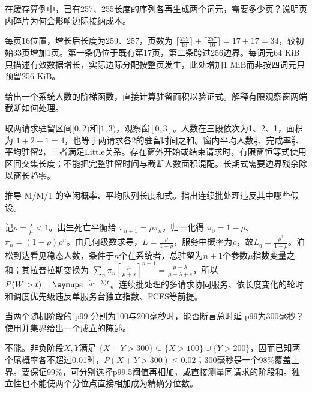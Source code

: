 \begin{exercises}
\begin{exercise} 在缓存算例中，已有257、255长度的序列各再生成两个词元，需要多少页？说明页内碎片为何会影响边际接纳成本。

\begin{solution}
每页16位置，增长后长度为259、257，页数为 $\lceil\frac{259}{16}\rceil+\lceil\frac{257}{16}\rceil=17+17=34$，较初始33页增加1页。第一条仍位于既有第17页，第二条跨过256边界。每词元64 KiB只描述有效数据增长，实际边际分配按整页发生，此处增加1 MiB而非按四词元只预留256 KiB。
\end{solution}
\end{exercise}

\begin{exercise} 给出一个系统人数的阶梯函数，直接计算驻留面积以验证式。解释有限观察窗两端截断如何处理。

\begin{solution}
取两请求驻留区间$[0,2)$和$[1,3)$，观察窗$[0,3]$。人数在三段依次为1、2、1，面积为 $1+2+1=4$，也等于两请求各2的驻留时间之和。窗内平均人数$\frac{4}{3}$、完成率$\frac{2}{3}$、平均驻留2，三者满足Little关系。存在窗外开始或结束请求时，有限窗恒等式使用区间交集长度；不能把完整驻留时间与截断人数面积混配。长期式需要边界残余除以窗长趋零。
\end{solution}
\end{exercise}

\begin{exercise}\optional 推导 M/M/1 的空闲概率、平均队列长度和式。指出连续批处理违反其中哪些假设。

\begin{solution}
记$\rho=\frac{\lambda}{\mu}<1$。出生死亡平衡给 $\pi_{n+1}=\rho\pi_n$，归一化得 $\pi_0=1-\rho$、$\pi_n=(1-\rho)\rho^n$。由几何级数求导，$L=\frac{\rho}{1-\rho}$，服务中概率为$\rho$，故$L_q=\frac{\rho^2}{1-\rho}$。泊松到达看见稳态人数，条件于$n$个在系统者，总驻留为$n+1$个参数$\mu$指数变量之和；其拉普拉斯变换为 $\sum_n\pi_n[\frac{\mu}{\mu+s}]^{n+1}=\frac{\mu-\lambda}{\mu-\lambda+s}$，所以 $P(W>t)=\conste{}^{-(\mu-\lambda)t}$。连续批处理的多请求协同服务、依长度变化的轮时和调度优先级违反单服务台独立指数、FCFS等前提。
\end{solution}
\end{exercise}

\begin{exercise} 当两个随机阶段的 p99 分别为100与200毫秒时，能否断言总时延 p99为300毫秒？使用并集界给出一个成立的陈述。

\begin{solution}
不能。非负阶段$X,Y$满足 $\{X+Y>300\}\subseteq\{X>100\}\cup\{Y>200\}$，因而已知两个尾概率各不超过0.01时，$P(X+Y>300)\le0.02$；300毫秒是一个98\%覆盖上界。要保证99\%，可分别选择p99.5阈值再相加，或直接测量同请求的阶段和。独立性也不能使两个分位点直接相加成为精确分位数。
\end{solution}
\end{exercise}


\end{exercises}
